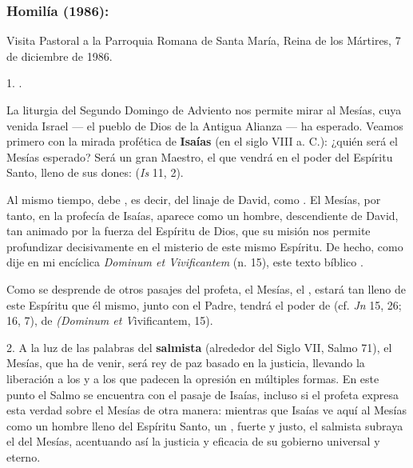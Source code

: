 \subsubsection{Homilía (1986):}

Visita Pastoral a la Parroquia Romana de Santa María, Reina de los Mártires, 7 de diciembre de 1986.

\begin{body}
	1. .
	
	La liturgia del Segundo Domingo de Adviento nos permite mirar al Mesías, cuya venida Israel --- el pueblo de Dios de la Antigua Alianza --- ha esperado. Veamos primero con la mirada profética de \textbf{Isaías} (en el siglo VIII a. C.): ¿quién será el Mesías esperado? Será un gran Maestro, el que vendrá en el poder del Espíritu Santo, lleno de sus dones:  (\emph{Is} 11, 2).
	
	Al mismo tiempo, debe , es decir, del linaje de David, como . El Mesías, por tanto, en la profecía de Isaías, aparece como un hombre, descendiente de David, tan animado por la fuerza del Espíritu de Dios, que su misión nos permite profundizar decisivamente en el misterio de este mismo Espíritu. De hecho, como dije en mi encíclica \emph{Dominum et Vivificantem} (n. 15), este texto bíblico .
	
	Como se desprende de otros pasajes del profeta, el Mesías, el , estará tan lleno de este Espíritu que él mismo, junto con el Padre, tendrá el poder de  (cf. \emph{Jn} 15, 26; 16, 7), de  \emph{(Dominum et V}ivificantem, 15).
	
	2. A la luz de las palabras del \textbf{salmista} (alrededor del Siglo VII, Salmo 71), el Mesías, que ha de venir, será rey de paz basado en la justicia, llevando la liberación a los  y a los que padecen la opresión en múltiples formas. En este punto el Salmo se encuentra con el pasaje de Isaías, incluso si el profeta expresa esta verdad sobre el Mesías de otra manera: mientras que Isaías ve aquí al Mesías como un hombre lleno del Espíritu Santo, un , fuerte y justo, el salmista subraya el  del Mesías, acentuando así la justicia y eficacia de su gobierno universal y eterno.
	

\end{body}
